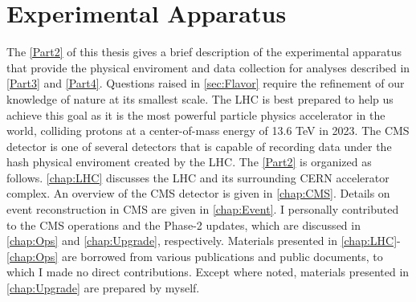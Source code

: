 \part{Experimental Apparatus}
\label{Part2}
The \autoref{Part2} of this thesis gives a brief description of the experimental apparatus that provide the physical enviroment and data collection for analyses described in \autoref{Part3} and \autoref{Part4}. Questions raised in \autoref{sec:Flavor} require the refinement of our knowledge of nature at its smallest scale. The \ac{LHC} is best prepared to help us achieve this goal as it is the most powerful particle physics accelerator in the world, colliding protons at a center-of-mass energy of 13.6 TeV in 2023. The \ac{CMS} detector is one of several detectors that is capable of recording data under the hash physical enviroment created by the \ac{LHC}. The \autoref{Part2} is organized as follows. \autoref{chap:LHC} discusses the \ac{LHC} and its surrounding \ac{CERN} accelerator complex. An overview of the \ac{CMS} detector is given in \autoref{chap:CMS}. Details on event reconstruction in \ac{CMS} are given in \autoref{chap:Event}. I personally contributed to the \ac{CMS} operations and the Phase-2 updates, which are discussed in \autoref{chap:Ops} and \autoref{chap:Upgrade}, respectively. Materials presented in \autoref{chap:LHC}-\autoref{chap:Ops} are borrowed from various publications and public documents, to which I made no direct contributions. Except where noted, materials presented in \autoref{chap:Upgrade} are prepared by myself.





